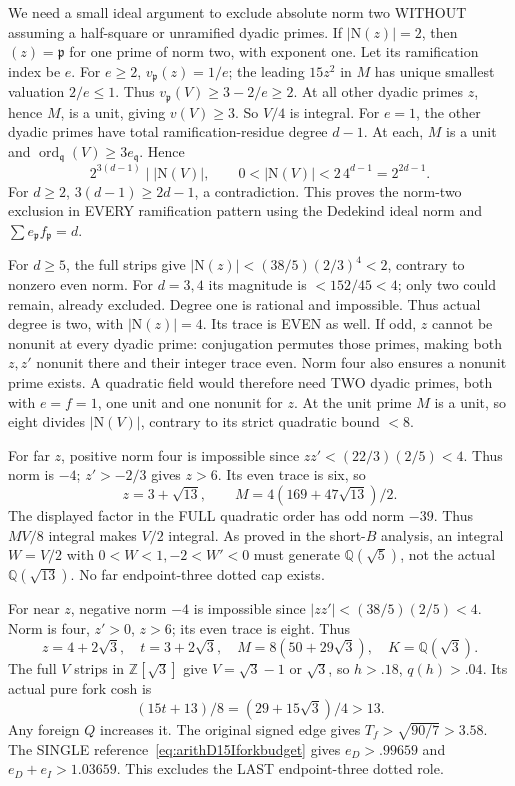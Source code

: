 We need a small ideal argument to exclude absolute
norm two WITHOUT assuming a half-square or unramified
dyadic primes.
If \(|\mathrm N(z)|=2\), then \((z)=\mathfrak p\)
for one prime of norm two, with exponent one.
Let its ramification index be \(e\).
For \(e\ge2\), \(v_{\mathfrak p}(z)=1/e\);
the leading \(15z^2\) in \(M\) has unique smallest
valuation \(2/e\le1\).
Thus \(v_{\mathfrak p}(V)\ge3-2/e\ge2\).
At all other dyadic primes \(z\), hence \(M\),
is a unit, giving \(v(V)\ge3\).
So \(V/4\) is integral.
For \(e=1\), the other dyadic primes have
total ramification-residue degree \(d-1\).
At each, \(M\) is a unit and
\(\operatorname{ord}_{\mathfrak q}(V)\ge3e_{\mathfrak q}\).
Hence
\[
             2^{3(d-1)}\mid |\mathrm N(V)|,
 \qquad 0<|\mathrm N(V)|<2\,4^{d-1}=2^{2d-1}.
\]
For \(d\ge2\), \(3(d-1)\ge2d-1\), a contradiction.
This proves the norm-two exclusion in EVERY
ramification pattern using the Dedekind ideal norm
and \(\sum e_{\mathfrak p}f_{\mathfrak p}=d\).

For \(d\ge5\), the full strips give
\(|\mathrm N(z)|<(38/5)(2/3)^4<2\),
contrary to nonzero even norm.
For \(d=3,4\) its magnitude is \(<152/45<4\);
only two could remain, already excluded.
Degree one is rational and impossible.
Thus actual degree is two, with
\(|\mathrm N(z)|=4\).
Its trace is EVEN as well.
If odd, \(z\) cannot be nonunit at every dyadic
prime: conjugation permutes those primes, making
both \(z,z'\) nonunit there and their integer
trace even.
Norm four also ensures a nonunit prime exists.
A quadratic field would therefore need TWO
dyadic primes, both with \(e=f=1\), one unit
and one nonunit for \(z\).
At the unit prime \(M\) is a unit, so eight
divides \(|\mathrm N(V)|\), contrary to its strict
quadratic bound \(<8\).

For far \(z\), positive norm four is impossible
since \(zz'<(22/3)(2/5)<4\).
Thus norm is \(-4\); \(z'>-2/3\) gives \(z>6\).
Its even trace is six, so
\[
 z=3+\sqrt{13},\qquad
 M=4(169+47\sqrt{13})/2 .
\]
The displayed factor in the FULL quadratic order
has odd norm \(-39\).
Thus \(MV/8\) integral makes \(V/2\) integral.
As proved in the short-\(B\) analysis, an integral
\(W=V/2\) with \(0<W<1,-2<W'<0\) must
generate \(\mathbb Q(\sqrt5)\), not the actual
\(\mathbb Q(\sqrt{13})\).
No far endpoint-three dotted cap exists.

For near \(z\), negative norm \(-4\) is impossible
since \(|zz'|<(38/5)(2/5)<4\).
Norm is four, \(z'>0\), \(z>6\);
its even trace is eight.
Thus
\[
 z=4+2\sqrt3,\quad t=3+2\sqrt3,\quad
 M=8(50+29\sqrt3),\quad K=\mathbb Q(\sqrt3).
\]
The full \(V\) strips in \(\mathbb Z[\sqrt3]\)
give \(V=\sqrt3-1\) or \(\sqrt3\), so
\(h>.18\), \(q(h)>.04\).
Its actual pure fork cosh is
\[
                  (15t+13)/8=(29+15\sqrt3)/4>13 .
\]
Any foreign \(Q\) increases it.
The original signed edge gives
\(T_f>\sqrt{90/7}>3.58\).
The SINGLE reference~\eqref{eq:arithD15Iforkbudget}
gives \(e_D>.99659\) and
\(e_D+e_I>1.03659\).
This excludes the LAST endpoint-three dotted role.

